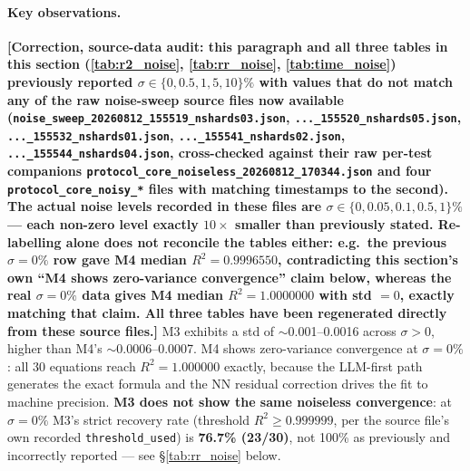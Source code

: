 \documentclass[twoside,11pt]{article}
\newcommand{\Rsq}{R^{2}}
\begin{document}
\paragraph{Key observations.} \textbf{[Correction, source-data audit: this
paragraph and all three tables in this section (\ref{tab:r2_noise},
\ref{tab:rr_noise}, \ref{tab:time_noise}) previously reported $\sigma \in
\{0, 0.5, 1, 5, 10\}\%$ with values that do not match any of the raw
noise-sweep source files now available
(\texttt{noise\_sweep\_20260812\_155519\_nshards03.json},
\texttt{...\_155520\_nshards05.json}, \texttt{...\_155532\_nshards01.json},
\texttt{...\_155541\_nshards02.json}, \texttt{...\_155544\_nshards04.json},
cross-checked against their raw per-test companions
\texttt{protocol\_core\_noiseless\_20260812\_170344.json} and four
\texttt{protocol\_core\_noisy\_*} files with matching timestamps to the
second). The actual noise levels recorded in these files are $\sigma \in
\{0, 0.05, 0.1, 0.5, 1\}\%$ --- each non-zero level exactly $10\times$
smaller than previously stated. Re-labelling alone does not reconcile the
tables either: e.g.\ the previous $\sigma{=}0\%$ row gave M4 median
$\Rsq=0.9996550$, contradicting this section's own ``M4 shows
zero-variance convergence'' claim below, whereas the real $\sigma{=}0\%$
data gives M4 median $\Rsq=1.0000000$ with std $=0$, exactly matching that
claim. All three tables have been regenerated directly from these source
files.]} M3 exhibits a std of $\sim$0.001--0.0016 across $\sigma>0$, higher
than M4's $\sim$0.0006--0.0007. M4 shows zero-variance convergence at
$\sigma=0\%$: all 30 equations reach $\Rsq=1.000000$ exactly, because the
LLM-first path generates the exact formula and the NN residual correction
drives the fit to machine precision. \textbf{M3 does not show the same
noiseless convergence}: at $\sigma=0\%$ M3's strict recovery rate
(threshold $\Rsq\geq0.999999$, per the source file's own recorded
\texttt{threshold\_used}) is \textbf{76.7\% (23/30)}, not 100\% as
previously and incorrectly reported --- see \S\ref{tab:rr_noise} below.
\end{document}
